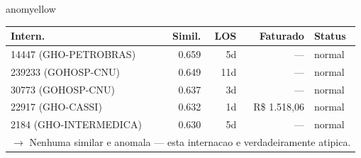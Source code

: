 \documentclass[a4paper,10pt]{article}
\begin{document}
\begin{anomalycard}[Internacao 2397 | GHO-PETROBRAS | MODERADO (z=2.03)]{anomyellow}
\begin{tabular}{l r r r l}\toprule\textbf{Intern.} & \textbf{Simil.} & \textbf{LOS} & \textbf{Faturado} & \textbf{Status} \\\midrule
14447 (GHO-PETROBRAS) & 0.659 & 5d & --- & \textcolor{jcubeblue}{normal} \\
239233 (GOHOSP-CNU) & 0.649 & 11d & --- & \textcolor{jcubeblue}{normal} \\
30773 (GOHOSP-CNU) & 0.637 & 3d & --- & \textcolor{jcubeblue}{normal} \\
22917 (GHO-CASSI) & 0.632 & 1d & R\$ 1.518,06 & \textcolor{jcubeblue}{normal} \\
2184 (GHO-INTERMEDICA) & 0.630 & 5d & --- & \textcolor{jcubeblue}{normal} \\
\multicolumn{5}{l}{\textcolor{jcubeblue}{\small $\rightarrow$ Nenhuma similar e anomala --- esta internacao e verdadeiramente atipica.}} \\
\bottomrule\end{tabular}


\end{anomalycard}

\newpage
\end{document}
